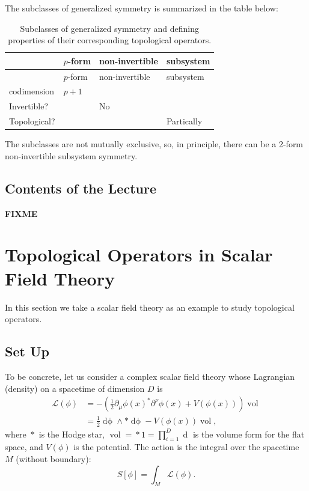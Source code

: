 \documentclass[
  letterpaper,
  DIV=11,
  numbers=noendperiod]{scrreport}
\DeclareMathOperator{\vol}{vol}
\newcommand{\stdim}{D}
\begin{document}
The subclasses of generalized symmetry is summarized in the table below:

\hypertarget{tbl-sym-classes}{}
\begin{longtable}[]{@{}llll@{}}
\caption{\label{tbl-sym-classes}Subclasses of generalized symmetry and
defining properties of their corresponding topological
operators.}\tabularnewline
\toprule\noalign{}
& \(p\)-form & non-invertible & subsystem \\
\midrule\noalign{}
\endfirsthead
\toprule\noalign{}
& \(p\)-form & non-invertible & subsystem \\
\midrule\noalign{}
\endhead
\bottomrule\noalign{}
\endlastfoot
codimension & \(p+1\) & & \\
Invertible? & & No & \\
Topological? & & & Partically \\
\end{longtable}

The subclasses are not mutually exclusive, so, in principle, there can
be a 2-form non-invertible subsystem symmetry.

\hypertarget{contents-of-the-lecture}{%
\section{Contents of the Lecture}\label{contents-of-the-lecture}}

\textbf{FIXME}


\hypertarget{sec-scalar}{%
\chapter{Topological Operators in Scalar Field
Theory}\label{sec-scalar}}

In this section we take a scalar field theory as an example to study
topological operators.

\hypertarget{set-up}{%
\section{Set Up}\label{set-up}}

To be concrete, let us consider a complex scalar field theory whose
Lagrangian (density) on a spacetime of dimension \(\stdim\) is \[
\begin{aligned}
\mathcal{L}(\phi) &=  - \left(\frac12 \partial_\mu \phi(x)^* \partial^\nu \phi(x) + V(\phi(x))\right)\vol\\
&= \frac{1}{2} \mathop{d\phi} \wedge *\mathop{d\phi} - V(\phi(x))\vol,
\end{aligned}
\] where \(\mathop{*}\) is the Hodge star,
\(\vol = \mathop{*} 1 = \prod_{i=1}^{\stdim} \mathop{dx_i}\) is the
volume form for the flat space, and \(V(\phi)\) is the potential. The
action is the integral over the spacetime \(M\) (without boundary): \[
S[\phi] = \int_{M}\mathcal{L}(\phi).
\]
\end{document}
